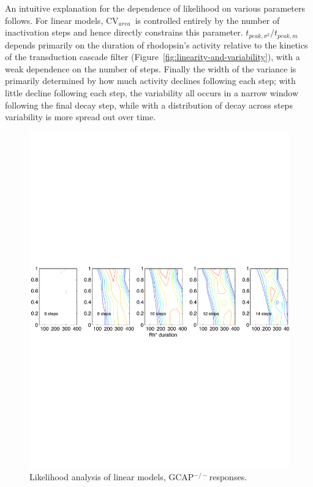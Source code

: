 \documentclass[12pt]{article}
\def\GCAPKO{GCAP$^{-/-}$}
\def\CVArea{CV$_{area}$~}
\def\tpeakratio{$t_{peak, \sigma^2} / t_{peak, m}$}
\begin{document}
An intuitive explanation for the dependence of likelihood on various parameters follows.  For linear models, \CVArea is controlled entirely by the number of inactivation steps and hence directly constrains this parameter.  \tpeakratio depends primarily on the duration of rhodopsin's activity relative to the kinetics of the transduction cascade filter (Figure~\ref{fig:linearity-and-variability}), with a weak dependence on the number of steps.  Finally the width of the variance is primarily determined by how much activity declines following each step; with little decline following each step, the variability all occurs in a narrow window following the final decay step, while with a distribution of decay across steps variability is more spread out over time.

\begin{figure}[h]
\begin{center}
\includegraphics[width=6in]{GCAPlikelihood.pdf}
\caption{Likelihood analysis of linear models, \GCAPKO responses.}
\label{fig:GCAPlikelihood}
\end{center}
\end{figure}
\end{document}
